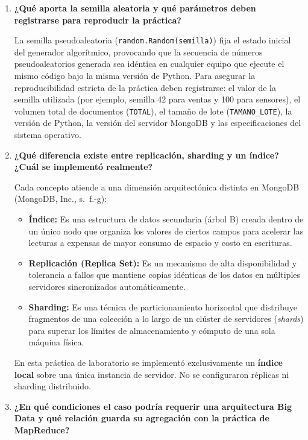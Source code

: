 \documentclass[12pt,a4paper]{article}
\begin{document}
\begin{enumerate}
    \item \textbf{¿Qué aporta la semilla aleatoria y qué parámetros deben registrarse para reproducir la práctica?}
    
    La semilla pseudoaleatoria (\texttt{random.Random(semilla)}) fija el estado inicial del generador algorítmico, provocando que la secuencia de números pseudoaleatorios generada sea idéntica en cualquier equipo que ejecute el mismo código bajo la misma versión de Python. Para asegurar la reproducibilidad estricta de la práctica deben registrarse: el valor de la semilla utilizada (por ejemplo, semilla 42 para ventas y 100 para sensores), el volumen total de documentos (\texttt{TOTAL}), el tamaño de lote (\texttt{TAMANO\_LOTE}), la versión de Python, la versión del servidor MongoDB y las especificaciones del sistema operativo.

    \item \textbf{¿Qué diferencia existe entre replicación, sharding y un índice? ¿Cuál se implementó realmente?}
    
    Cada concepto atiende a una dimensión arquitectónica distinta en MongoDB (MongoDB, Inc., s.~f.-g):
    \begin{itemize}
        \item \textbf{Índice:} Es una estructura de datos secundaria (árbol B) creada dentro de un único nodo que organiza los valores de ciertos campos para acelerar las lecturas a expensas de mayor consumo de espacio y costo en escrituras.
        \item \textbf{Replicación (Replica Set):} Es un mecanismo de alta disponibilidad y tolerancia a fallos que mantiene copias idénticas de los datos en múltiples servidores sincronizados automáticamente.
        \item \textbf{Sharding:} Es una técnica de particionamiento horizontal que distribuye fragmentos de una colección a lo largo de un clúster de servidores (\textit{shards}) para superar los límites de almacenamiento y cómputo de una sola máquina física.
    \end{itemize}
    En esta práctica de laboratorio se implementó exclusivamente un \textbf{índice local} sobre una única instancia de servidor. No se configuraron réplicas ni sharding distribuido.

    \item \textbf{¿En qué condiciones el caso podría requerir una arquitectura Big Data y qué relación guarda su agregación con la práctica de MapReduce?}
    

\end{enumerate}
\end{document}
